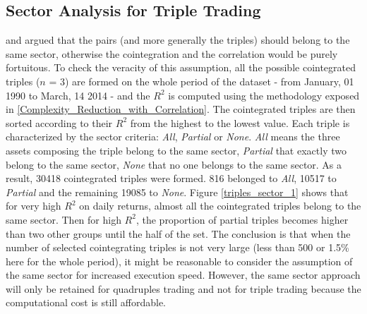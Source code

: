 \documentclass[11pt,a4,twosided,singlespacing,titlepagenumber=on]{scrreprt}
\numberwithin{equation}{chapter} %
\theoremstyle{remark}
\begin{document}
\subsection{Sector Analysis for Triple Trading}
\cite{chan2009} and \cite{dunis2010} argued that the pairs (and more generally the triples) should belong to the same sector, otherwise the cointegration and the correlation would be purely fortuitous. To check the veracity of this assumption, all the possible cointegrated triples ($n$ = 3) are formed on the whole period of the dataset  - from January, 01 1990 to March, 14 2014 - and the $R^2$ is computed using the methodology exposed in \ref{Complexity_Reduction_with_Correlation}. The cointegrated triples are then sorted according to their $R^2$ from the highest to the lowest value. Each triple is characterized by the sector criteria: \textit{All}, \textit{Partial} or \textit{None}. \textit{All} means the three assets composing the triple belong to the same sector, \textit{Partial} that exactly two belong to the same sector, \textit{None} that no one belongs to the same sector. As a result, 30418 cointegrated triples were formed. 816 belonged to \textit{All}, 10517 to \textit{Partial} and the remaining 19085 to \textit{None}. Figure \ref{triples_sector_1} shows that for very high $R^2$ on daily returns, almost all the cointegrated triples belong to the same sector. Then for high $R^2$, the proportion of partial triples becomes higher than two other groups until the half of the set. The conclusion is that when the number of selected cointegrating triples is not very large (less than 500 or 1.5\% here for the whole period), it might be reasonable to consider the assumption of the same sector for increased execution speed. However, the same sector approach will only be retained for quadruples trading and not for triple trading because the computational cost is still affordable.
\end{document}
